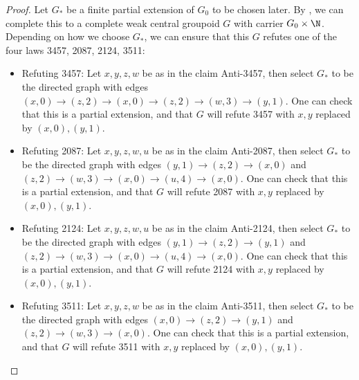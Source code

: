 \begin{proof}
  Let $G_*$ be a finite partial extension of $G_0$ to be chosen later. By , we can complete this to a complete weak central groupoid $G$ with carrier $G_0 \times \N$. Depending on how we choose $G_*$, we can ensure that this $G$ refutes one of the four laws 3457, 2087, 2124, 3511:
  \begin{itemize}
   \item Refuting 3457: Let $x,y,z,w$ be as in the claim Anti-3457, then select $G_*$ to be the directed graph with edges $(x,0) \to (z,2) \to (x,0) \to (z,2) \to (w,3) \to (y,1)$. One can check that this is a partial extension, and that $G$ will refute 3457 with $x,y$ replaced by $(x,0),(y,1)$.
   \item Refuting 2087: Let $x,y,z,w,u$ be as in the claim Anti-2087, then select $G_*$ to be the directed graph with edges $(y,1) \to (z,2) \to (x,0)$ and $(z,2) \to (w,3) \to (x,0) \to (u,4) \to (x,0)$. One can check that this is a partial extension, and that $G$ will refute 2087 with $x,y$ replaced by $(x,0),(y,1)$.
   \item Refuting 2124: Let $x,y,z,w,u$ be as in the claim Anti-2124, then select $G_*$ to be the directed graph with edges $(y,1) \to (z,2) \to (y,1)$ and $(z,2) \to (w,3) \to (x,0) \to (u,4) \to (x,0)$. One can check that this is a partial extension, and that $G$ will refute 2124 with $x,y$ replaced by $(x,0),(y,1)$.
   \item Refuting 3511: Let $x,y,z,w$ be as in the claim Anti-3511, then select $G_*$ to be the directed graph with edges $(x,0) \to (z,2) \to (y,1)$ and $(z,2) \to (w,3) \to (x,0)$. One can check that this is a partial extension, and that $G$ will refute 3511 with $x,y$ replaced by $(x,0),(y,1)$.
  \end{itemize}
\end{proof}

